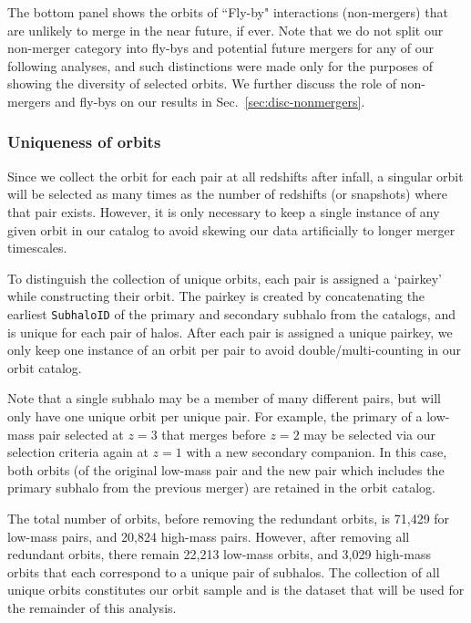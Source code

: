 \documentclass[twocolumn,linenumbers]{aastex631}
\begin{document}
The bottom panel shows the orbits of ``Fly-by" interactions (non-mergers) that are unlikely to merge in the near future, if ever.  
Note that we do not split our non-merger category into fly-bys and potential future mergers for any of our following analyses, and such distinctions were made only for the purposes of showing the diversity of selected orbits. We further discuss the role of non-mergers and fly-bys on our results in Sec.~\ref{sec:disc-nonmergers}.


\subsubsection{Uniqueness of orbits}
\label{sec:methods-unique}
Since we collect the orbit for each pair at all redshifts after infall, a singular orbit will be selected as many times as the number of redshifts (or snapshots) where that pair exists. However, it is only necessary to keep a single instance of any given orbit in our catalog to avoid skewing our data artificially to longer merger timescales.

To distinguish the collection of unique orbits, each pair is assigned a `pairkey' while constructing their orbit. 
The pairkey is created by concatenating the earliest \texttt{SubhaloID} of the primary and secondary subhalo from the \sublink{} catalogs, and is unique for each pair of halos. 
After each pair is assigned a unique pairkey, we only keep one instance of an orbit per pair to avoid double/multi-counting in our orbit catalog.

Note that a single subhalo may be a member of many different pairs, but will only have one unique orbit per unique pair.
For example, the primary of a low-mass pair selected at $z=3$ that merges before $z=2$ may be selected via our selection criteria again at $z=1$ with a new secondary companion. 
In this case, both orbits (of the original low-mass pair and the new pair which includes the primary subhalo from the previous merger) are retained in the orbit catalog.%

The total number of orbits, before removing the redundant orbits,  %
is 71,429 for low-mass pairs, and 20,824 high-mass pairs. 
However, after removing all redundant orbits, there remain 22,213 low-mass orbits, and 3,029 high-mass orbits that each correspond to a unique pair of subhalos. The collection of all unique orbits constitutes our orbit sample and is the dataset that will be used for the remainder of this analysis.
\end{document}
